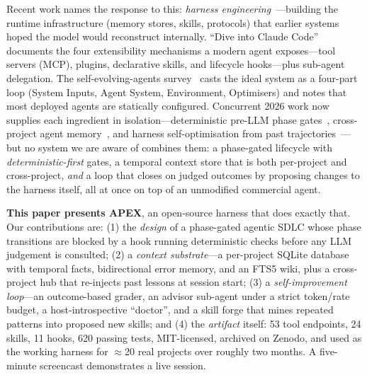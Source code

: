 \documentclass[sigconf,review,anonymous=false]{acmart}
\begin{document}
Recent work names the response to this: \emph{harness
engineering}~\cite{zhou2026external}---building the runtime infrastructure
(memory stores, skills, protocols) that earlier systems hoped the model would
reconstruct internally. ``Dive into Claude Code''~\cite{liu2026divecc} documents
the four extensibility mechanisms a modern agent exposes---tool servers (MCP),
plugins, declarative skills, and lifecycle hooks---plus sub-agent delegation. The
self-evolving-agents survey~\cite{fang2025selfevolve} casts the ideal system as a
four-part loop (System Inputs, Agent System, Environment, Optimisers) and notes
that most deployed agents are statically configured. Concurrent 2026 work now
supplies each ingredient in isolation---deterministic pre-LLM phase
gates~\cite{madatha2026relaibuild}, cross-project agent
memory~\cite{malo2026projectmem}, and harness self-optimisation from past
trajectories~\cite{rho2026}---but no system we are aware of combines them: a
phase-gated lifecycle with \emph{deterministic-first} gates, a temporal context
store that is both per-project and cross-project, \emph{and} a loop that closes on
judged outcomes by proposing changes to the harness itself, all at once on top of an
unmodified commercial agent.

\textbf{This paper presents APEX}, an open-source harness that does exactly that.
Our contributions are: (1) the \emph{design} of a phase-gated agentic SDLC whose
phase transitions are blocked by a hook running deterministic checks before any
LLM judgement is consulted; (2) a \emph{context substrate}---a per-project SQLite
database with temporal facts, bidirectional error memory, and an FTS5 wiki, plus a
cross-project hub that re-injects past lessons at session start; (3) a
\emph{self-improvement loop}---an outcome-based grader, an advisor sub-agent under
a strict token/rate budget, a host-introspective ``doctor'', and a skill forge
that mines repeated patterns into proposed new skills; and (4) the \emph{artifact}
itself: 53 tool endpoints, 24 skills, 11 hooks, 620 passing tests, MIT-licensed,
archived on Zenodo, and used as the working harness for \(\approx\)20 real
projects over roughly two months. A five-minute screencast demonstrates a live
session.

\end{document}

